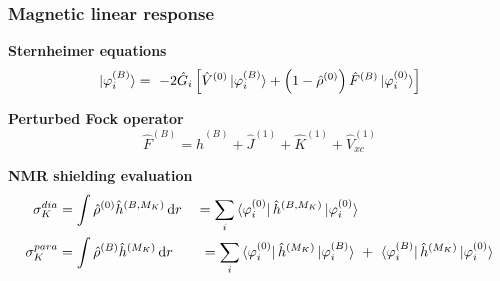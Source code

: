 \begin{frame}
\frametitle{Magnetic linear response}

\centering
\textbf{Sternheimer equations}
\begin{equation}
    \nonumber
    \ket{\varphi_i^{(B)}} =\
    -2\hat{G}_i\left[\hat{V}^{(0)}\ket{\varphi_i^{(B)}}
    + \left(1 - \hat{\rho}^{(0)}\right)\hat{F}^{(B)}\ket{\varphi_i^{(0)}}\right]
\end{equation}

\vspace{5mm}

\textbf{Perturbed Fock operator}
\begin{equation}
    \nonumber
    \hat{F}^{(B)} = \hat{h}^{(B)} + \hat{J}^{(1)} + \hat{K}^{(1)} +
    \hat{V}_{xc}^{(1)}
\end{equation}

\vspace{10mm}

\pause
\textbf{NMR shielding evaluation}
\begin{align}
    \nonumber
    \sigma_K^{dia} 
    &= \int \hat{\rho}^{(0)}\hat{h}^{(B,M_K)} \ud r \quad
    = \sum_i\bra{\orbital_i^{(0)}}\hat{h}^{(B,M_K)}\ket{\orbital_i^{(0)}} \\
    \nonumber
    \sigma_K^{para} 
    &= \int \hat{\rho}^{(B)}\hat{h}^{(M_K)} \ud r \qquad
    = \sum_i
    \bra{\orbital_i^{(0)}}\hat{h}^{(M_K)}\ket{\orbital_i^{(B)}}\ +\ 
    \bra{\orbital_i^{(B)}}\hat{h}^{(M_K)}\ket{\orbital_i^{(0)}}
\end{align}
\end{frame}

    
